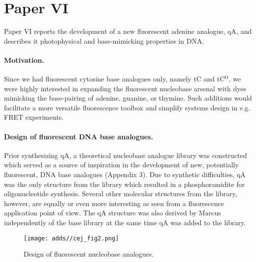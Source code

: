 \section{Paper VI}
 Paper VI reports the development of a new fluorescent adenine analogue, qA, and describes it photophysical and base-mimicking properties in DNA.

 \paragraph{Motivation.} Since we had fluorescent cytosine base analogues only, namely tC and tC$^\mathrm{O}$, we were highly interested in expanding the fluorescent nucleobase arsenal with dyes mimicking the base-pairing of adenine, guanine, or thymine. Such additions would facilitate a more versatile fluorescence toolbox and simplify systems design in e.g. FRET experiments.

 \paragraph{Design of fluorescent DNA base analogues.} Prior synthesizing qA, a theoretical nucleobase analogue library was constructed which served as a source of inspiration in the development of new, potentially fluorescent, DNA base analogues (Appendix 3). Due to synthetic difficulties, qA was the only structure from the library which resulted in a phosphoramidite for oligonucleotide synthesis. Several other molecular structures from the library, however, are equally or even more interesting as seen from a fluorescence application point of view. The qA structure was also derived by Marcus independently of the base library at the same time qA was added to the library.

\begin{figure}
    \centering
        \texttt{[image: adds//cej\_fig2.png]}
    \captionsetup{width=.95\textwidth}
    \caption{Design of fluorescent nucleobase analogues.}
    \label{Fig:chap_Papers_CEJ2}
\end{figure}

